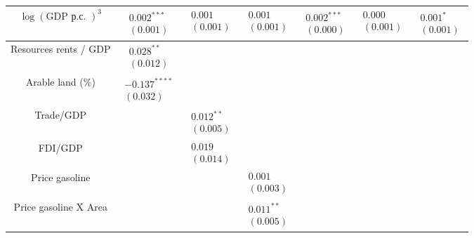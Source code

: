 \documentclass[10pt]{article}
\begin{document}
\begin{center}
\begin{tabular}{|c|c|c|c|c|c|c|}
$\log (\mathrm{GDP} \text { р.с. })^{3}$ & $\begin{array}{l}0.002^{* * *} \\ (0.001)\end{array}$ & $\begin{array}{l}0.001 \\ (0.001)\end{array}$ & $\begin{array}{l}0.001 \\ (0.001)\end{array}$ & $\begin{array}{l}0.002^{* * *} \\ (0.000)\end{array}$ & $\begin{array}{l}0.000 \\ (0.001)\end{array}$ & $\begin{array}{l}0.001^{*} \\ (0.001)\end{array}$ \\
\hline
Resources rents / GDP & $\begin{array}{l}0.028^{* *} \\ (0.012)\end{array}$ &  &  &  &  &  \\
\hline
Arable land (\%) & $\begin{array}{l}-0.137^{* * * *} \\ (0.032)\end{array}$ &  &  &  &  &  \\
\hline
Trade/GDP &  & $\begin{array}{l}0.012^{* *} \\ (0.005)\end{array}$ &  &  &  &  \\
\hline
FDI/GDP &  & $\begin{array}{l}0.019 \\ (0.014)\end{array}$ &  &  &  &  \\
\hline
Price gasoline &  &  & $\begin{array}{l}0.001 \\ (0.003)\end{array}$ &  &  &  \\
\hline
Price gasoline X Area &  &  & $\begin{array}{l}0.011^{* *} \\ (0.005)\end{array}$ &  &  &  \\

\end{tabular}
\end{center}
\end{document}
